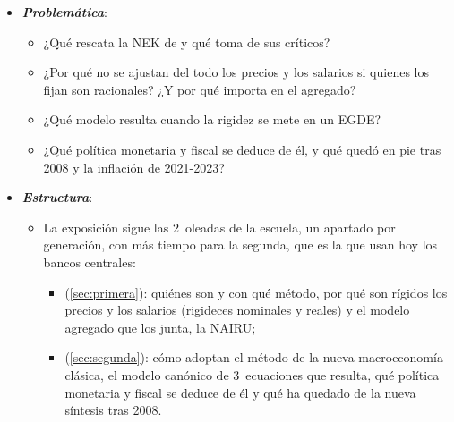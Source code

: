 \documentclass[11pt]{article}
\begin{document}
\begin{itemize}
\begin{itemize}
\begin{itemize}
    \item la  (desde los 90) mete esas rigideces dentro del EGDE de la NMC: es la \nocite{GoodfriendKing1997New}.
    \end{itemize}
  \item Dos conceptos recorren la exposición, la  y la , que se distinguen en el cuadro~\ref{tab:rigideces}: sin rigidez nominal el dinero es neutral aunque haya rigideces reales, y con las 2~las reales amplifican y alargan los efectos de las nominales\nocite{BallRomer1990Real}.
  \end{itemize}

\item \textbf{\emph{Problemática}}:
  \begin{itemize}
  \item ¿Qué rescata la NEK de  y qué toma de sus críticos?
  \item ¿Por qué no se ajustan del todo los precios y los salarios si quienes los fijan son racionales? ¿Y por qué importa en el agregado?
  \item ¿Qué modelo resulta cuando la rigidez se mete en un EGDE?
  \item ¿Qué política monetaria y fiscal se deduce de él, y qué quedó en pie tras 2008 y la inflación de 2021-2023?
  \end{itemize}

\item \textbf{\emph{Estructura}}:
  \begin{itemize}
  \item La exposición sigue las 2~oleadas de la escuela, un apartado por generación, con más tiempo para la segunda, que es la que usan hoy los bancos centrales:
    \begin{itemize}
    \item {} (\ref{sec:primera}): quiénes son y con qué método, por qué son rígidos los precios y los salarios (rigideces nominales y reales) y el modelo agregado que los junta, la NAIRU;
    \item {} (\ref{sec:segunda}): cómo adoptan el método de la nueva macroeconomía clásica, el modelo canónico de 3~ecuaciones que resulta, qué política monetaria y fiscal se deduce de él y qué ha quedado de la nueva síntesis tras 2008.
    \end{itemize}
  \end{itemize}
\end{itemize}
\end{document}
